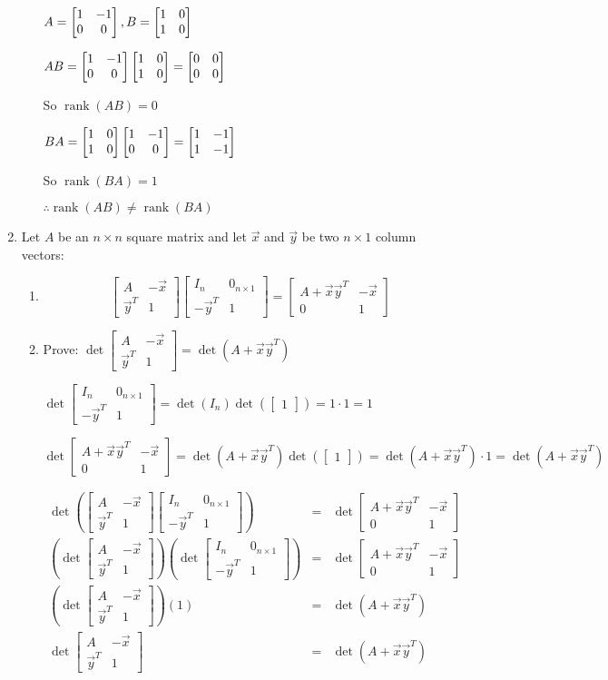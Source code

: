 \documentclass[letterpaper,12pt,fleqn]{article}
\DeclareMathOperator{\rank}{rank}
\newcommand{\vx}{\vec{x}}
\newcommand{\vy}{\vec{y}}
\begin{document}
\begin{enumerate}
\begin{enumerate}
    $A=\begin{bmatrix} 1 & -1 \\ 0 & 0 \end{bmatrix}, B=\begin{bmatrix} 1 & 0 \\ 1 & 0 \end{bmatrix}$

    $AB=\begin{bmatrix} 1 & -1 \\ 0 & 0 \end{bmatrix}\begin{bmatrix} 1 & 0 \\ 1 & 0 \end{bmatrix}=\begin{bmatrix} 0 & 0 \\ 0 & 0 \end{bmatrix}$

    So $\rank(AB)=0$

    $BA=\begin{bmatrix} 1 & 0 \\ 1 & 0 \end{bmatrix}\begin{bmatrix} 1 & -1 \\ 0 & 0 \end{bmatrix}=\begin{bmatrix} 1 & -1 \\ 1 & -1 \end{bmatrix}$

    So $\rank(BA)=1$

    $\therefore\rank(AB)\ne\rank(BA)$
  \end{enumerate}

  \newcommand{\mm}{\begin{bmatrix}
      A & -\vx \\ \vy^T & 1
  \end{bmatrix}}
  \newcommand{\mn}{\begin{bmatrix}
      I_n & 0_{n\times 1} \\ -\vy^T & 1
  \end{bmatrix}}
  \newcommand{\mo}{\begin{bmatrix}
      A+\vx\vy^T & -\vx \\ 0 & 1
  \end{bmatrix}}

  \newpage
  
\item Let $A$ be an $n\times n$ square matrix and let $\vx$ and $\vy$ be
  two $n\times 1$ column vectors:
  \begin{enumerate}
  \item
    \[\mm\mn=\mo\]

  \item Prove: $\det\mm=\det(A+\vx\vy^T)$

    $\det\mn=\det(I_n)\det(\begin{bmatrix} 1 \end{bmatrix})=1\cdot1=1$

    $\det\mo=\det(A+\vx\vy^T)\det(\begin{bmatrix} 1 \end{bmatrix})=
    \det(A+\vx\vy^T)\cdot1=\det(A+\vx\vy^T)$

    \begin{eqnarray*}
      \det\left(\mm\mn\right) &=& \det\mo \\
      \left(\det\mm\right)\left(\det\mn\right) &=& \det\mo \\
      \left(\det\mm\right)(1) &=& \det(A+\vx\vy^T) \\
      \det\mm &=& \det(A+\vx\vy^T)
    \end{eqnarray*}
    
  \end{enumerate}

\end{enumerate}
\end{document}
